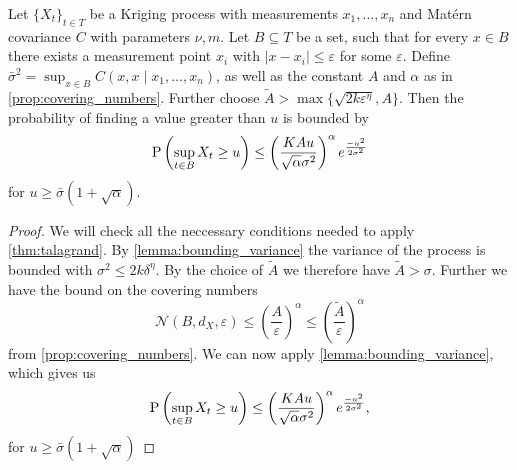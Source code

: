 %
%
\begin{theorem}
    Let $ \{ X_{t} \}_{t \in T}$ be a Kriging process with measurements $x_{1}, \dots, x_{n}$  and Matérn covariance $C$ with parameters $\nu,m$.
    Let $B \subseteq T$ be a set, such that for every $x \in B$ there exists a measurement point $x_{i}$ with $\lvert x-x_{i} \rvert \leq \varepsilon$ for some $\varepsilon$.
    Define $\bar{\sigma}^2= \sup_{x \in B} C(x,x \mid x_{1}, \dots, x_{n})$, as well as the constant $A$ and $\alpha$ as in \cref{prop:covering_numbers}.
    Further choose \( \tilde{A} > \max \{ \sqrt{ 2k \varepsilon^{\eta}}, A \} \).
    Then the probability of finding a value greater than $u$ is bounded by
    \[
        \mathrm{P} \left( \sup_{t \in B} X_{t} \geq u \right)
        \leq  \left(\frac{K A u}{\sqrt{\alpha} \sigma^2} \right)^{\alpha} e^{\frac{-u^2}{2\sigma^2}}
    \]
    for $u \geq \bar{\sigma}(1+\sqrt{\alpha})$.
\end{theorem}
\begin{proof}
    We will check all the neccessary conditions needed to apply \cref{thm:talagrand}.
    By \cref{lemma:bounding_variance} the variance of the process is bounded with $\sigma^2 \leq 2k \delta^{\eta}$. By the choice of $\tilde{A}$ we therefore have $\tilde{A} > \sigma$.
    Further we have the bound on the covering numbers
    \[
        \mathcal{N}(B,d_{X},\varepsilon) \leq \left( \frac{A}{\varepsilon} \right)^{\alpha} \leq \left( \frac{\tilde{A}}{\varepsilon} \right)^{\alpha}
    \]
    from \cref{prop:covering_numbers}.
    We can now apply \cref{lemma:bounding_variance}, which gives us 
    \[
        \mathrm{P} \left( \sup_{t \in B} X_{t} \geq u \right)
        \leq  \left(\frac{K A u}{\sqrt{\alpha} \sigma^2} \right)^{\alpha} e^{\frac{-u^2}{2\sigma^2}},
    \]
    for $u \geq \bar{\sigma}(1+\sqrt{\alpha})$
\end{proof}


